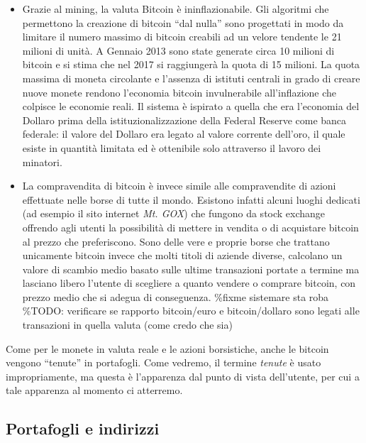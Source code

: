 \begin{itemize}
\item
  Grazie al mining, la valuta Bitcoin è ininflazionabile. Gli algoritmi
  che permettono la creazione di bitcoin ``dal nulla'' sono progettati
  in modo da limitare il numero massimo di bitcoin creabili ad un velore
  tendente le 21 milioni di unità. A Gennaio 2013 sono state generate
  circa 10 milioni di bitcoin e si stima che nel 2017 si raggiungerà la
  quota di 15 milioni. La quota massima di moneta circolante e l'assenza
  di istituti centrali in grado di creare nuove monete rendono
  l'economia bitcoin invulnerabile all'inflazione che colpisce le
  economie reali. Il sistema è ispirato a quella che era l'economia del
  Dollaro prima della istituzionalizzazione della Federal Reserve come
  banca federale: il valore del Dollaro era legato al valore corrente
  dell'oro, il quale esiste in quantità limitata ed è ottenibile solo
  attraverso il lavoro dei minatori.
\item
  La compravendita di bitcoin è invece simile alle compravendite di
  azioni effettuate nelle borse di tutte il mondo. Esistono infatti
  alcuni luoghi dedicati (ad esempio il sito internet \emph{Mt. GOX})
  che fungono da stock exchange offrendo agli utenti la possibilità di
  mettere in vendita o di acquistare bitcoin al prezzo che preferiscono.
  Sono delle vere e proprie borse che trattano unicamente bitcoin invece
  che molti titoli di aziende diverse, calcolano un valore di scambio
  medio basato sulle ultime transazioni portate a termine ma lasciano
  libero l'utente di scegliere a quanto vendere o comprare bitcoin, con
  prezzo medio che si adegua di conseguenza. \%fixme sistemare sta roba
  \%TODO: verificare se rapporto bitcoin/euro e bitcoin/dollaro sono
  legati alle transazioni in quella valuta (come credo che sia)
\end{itemize}

Come per le monete in valuta reale e le azioni borsistiche, anche le
bitcoin vengono ``tenute'' in portafogli. Come vedremo, il termine
\emph{tenute} è usato impropriamente, ma questa è l'apparenza dal punto
di vista dell'utente, per cui a tale apparenza al momento ci atterremo.

\subsection{Portafogli e indirizzi}\label{portafogli-e-indirizzi}

